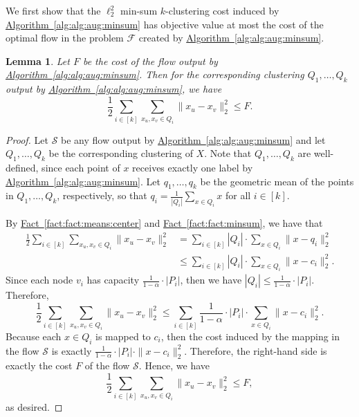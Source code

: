 \documentclass[11pt]{article}
\newtheorem{lemma}[theorem]{Lemma}
\newcommand{\namedref}[2]{\hyperref[#2]{#1~\ref*{#2}}}
\newcommand{\lemlab}[1]{\label{lem:#1}}
\newcommand{\factref}[1]{\namedref{Fact}{fact:#1}}
\renewcommand{\algref}[1]{\namedref{Algorithm}{alg:#1}}
\def \calF    {\mdef{\mathcal{F}}}
\def \calS    {\mdef{\mathcal{S}}}
\newcommand{\mdef}[1]{{\ensuremath{#1}}\xspace}  %
\begin{document}
We first show that the $\ell_2^2$ min-sum $k$-clustering cost induced by \algref{alg:aug:minsum} has objective value at most the cost of the optimal flow in the problem $\calF$ created by \algref{alg:aug:minsum}.  
\begin{lemma}
\lemlab{lem:flow:to:cost:one}
Let $F$ be the cost of the flow output by \algref{alg:aug:minsum}. 
Then for the corresponding clustering $Q_1,\ldots,Q_k$ output by \algref{alg:aug:minsum}, we have
\[\frac{1}{2}\sum_{i\in[k]}\sum_{x_u,x_v\in Q_i}\|x_u-x_v\|_2^2\le F.\]
\end{lemma}
\begin{proof}
Let $\calS$ be any flow output by \algref{alg:aug:minsum} and let $Q_1,\ldots,Q_k$ be the corresponding clustering of $X$. 
Note that $Q_1,\ldots,Q_k$ are well-defined, since each point of $x$ receives exactly one label by \algref{alg:aug:minsum}. 
Let $q_1,\ldots,q_k$ be the geometric mean of the points in $Q_1,\ldots,Q_k$, respectively, so that $q_i=\frac{1}{|Q_i|}\sum_{x \in Q_i}x$ for all $i\in[k]$. 

By \factref{fact:means:center} and \factref{fact:minsum}, we have that
\begin{align*}
\frac{1}{2}\sum_{i\in[k]}\sum_{x_u,x_v\in Q_i}\|x_u-x_v\|_2^2&=\sum_{i\in[k]}|Q_i|\cdot\sum_{x\in Q_i}\|x-q_i\|_2^2\\
&\le\sum_{i\in[k]}|Q_i|\cdot\sum_{x\in Q_i}\|x-c_i\|_2^2.
\end{align*}
Since each node $v_i$ has capacity $\frac{1}{1-\alpha}\cdot|P_i|$, then we have $|Q_i|\le\frac{1}{1-\alpha}\cdot|P_i|$. 
Therefore,
\[\frac{1}{2}\sum_{i\in[k]}\sum_{x_u,x_v\in Q_i}\|x_u-x_v\|_2^2\le\sum_{i\in[k]}\frac{1}{1-\alpha}\cdot|P_i|\cdot\sum_{x\in Q_i}\|x-c_i\|_2^2.\]
Because each $x\in Q_i$ is mapped to $c_i$, then the cost induced by the mapping in the flow $\calS$ is exactly $\frac{1}{1-\alpha}\cdot|P_i|\cdot\|x-c_i\|_2^2$. 
Therefore, the right-hand side is exactly the cost $F$ of the flow $\calS$. 
Hence, we have
\[\frac{1}{2}\sum_{i\in[k]}\sum_{x_u,x_v\in Q_i}\|x_u-x_v\|_2^2\le F,\]
as desired.
\end{proof}
\end{document}
